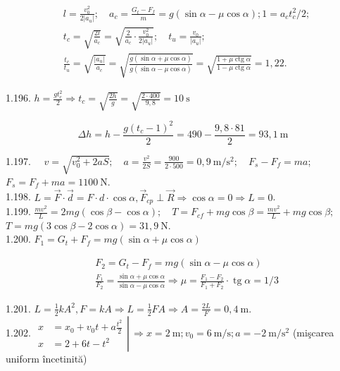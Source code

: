 $$
\begin{aligned}
& l=\frac{v_{0}^{2}}{2\left|a_{u}\right|} ; \quad a_{c}=\frac{G_{t}-F_{f}}{m}=g(\sin \alpha-\mu \cos \alpha) ; 1=a_{c} t_{c}^{2} / 2 ; \\
& t_{c}=\sqrt{\frac{2 l}{a_{c}}}=\sqrt{\frac{2}{a_{c}} \cdot \frac{v_{0}^{2}}{2\left|a_{u}\right|}} ; \quad t_{u}=\frac{v_{0}}{\left|a_{u}\right|} ; \\
& \frac{t_{c}}{t_{u}}=\sqrt{\frac{\left|a_{u}\right|}{a_{c}}}=\sqrt{\frac{g(\sin \alpha+\mu \cos \alpha)}{g(\sin \alpha-\mu \cos \alpha)}}=\sqrt{\frac{1+\mu \operatorname{ctg} \alpha}{1-\mu \operatorname{ctg} \alpha}}=1,22 .
\end{aligned}
$$

1.196. $h=\frac{g t_{c}^{2}}{2} \Rightarrow t_{c}=\sqrt{\frac{2 h}{g}}=\sqrt{\frac{2 \cdot 400}{9,8}}=10 \mathrm{~s}$

$$
\Delta h=h-\frac{g\left(t_{c}-1\right)^{2}}{2}=490-\frac{9,8 \cdot 81}{2}=93,1 \mathrm{~m}
$$

1.197. $\quad v=\sqrt{v_{0}^{2}+2 a S} ; \quad a=\frac{v^{2}}{2 S}=\frac{900}{2 \cdot 500}=0,9 \mathrm{~m} / \mathrm{s}^{2} ; \quad F_{s}-F_{f}=m a$; $F_{s}=F_{f}+m a=1100 \mathrm{~N}$.\\
1.198. $L=\vec{F} \cdot \vec{d}=F \cdot d \cdot \cos \alpha, \vec{F}_{c p} \perp \vec{R} \Rightarrow \cos \alpha=0 \Rightarrow L=0$.\\
1.199. $\frac{m v^{2}}{L}=2 m g(\cos \beta-\cos \alpha) ; \quad T=F_{c f}+m g \cos \beta=\frac{m v^{2}}{L}+m g \cos \beta ;$ $T=m g(3 \cos \beta-2 \cos \alpha)=31,9 \mathrm{~N}$.\\
1.200. $F_{1}=G_{t}+F_{f}=m g(\sin \alpha+\mu \cos \alpha)$

$$
\begin{aligned}
& F_{2}=G_{t}-F_{f}=m g(\sin \alpha-\mu \cos \alpha) \\
& \frac{F_{1}}{F_{2}}=\frac{\sin \alpha+\mu \cos \alpha}{\sin \alpha-\mu \cos \alpha} \Rightarrow \mu=\frac{F_{1}-F_{2}}{F_{1}+F_{2}} \cdot \operatorname{tg} \alpha=1 / 3
\end{aligned}
$$

1.201. $L=\frac{1}{2} k A^{2}, F=k A \Rightarrow L=\frac{1}{2} F A \Rightarrow A=\frac{2 L}{F}=0,4 \mathrm{~m}$.\\
1.202. $\left.\begin{aligned} x & =x_{0}+v_{0} t+a \frac{t^{2}}{2} \\ x & =2+6 t-t^{2}\end{aligned} \right\rvert\, \Rightarrow x=2 \mathrm{~m} ; v_{0}=6 \mathrm{~m} / \mathrm{s} ; a=-2 \mathrm{~m} / \mathrm{s}^{2}$ (mişcarea uniform încetinită)

